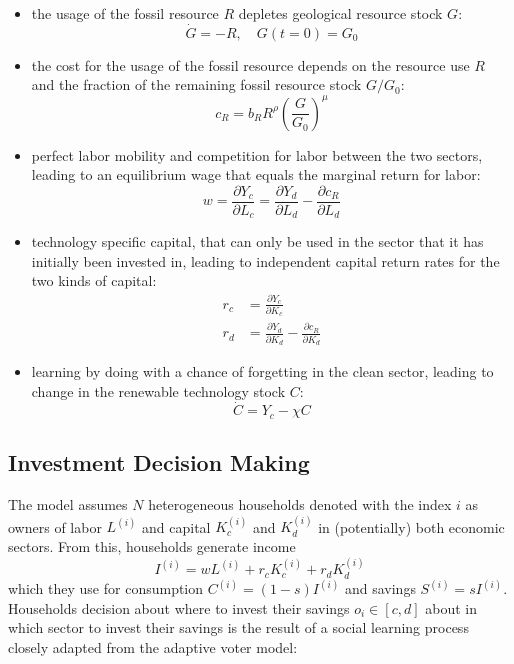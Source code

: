 \begin{itemize}
	\item the usage of the fossil resource $R$ depletes geological resource stock $G$:
		\begin{equation}
			\dot{G} = -R, \quad G(t=0) = G_0
			\label{resource_depletion}
		\end{equation}
	\item the cost for the usage of the fossil resource depends on the resource use $R$ and the fraction of the remaining fossil resource stock $G/G_0$:
		\begin{equation}
			c_R = b_R R^{\rho}\left( \frac{G}{G_0} \right)^{\mu}
			\label{resource cost}
		\end{equation}
	\item perfect labor mobility and competition for labor between the two sectors, leading to an equilibrium wage that equals the marginal return for labor:
		\begin{equation}
			w = \frac{\partial Y_c}{\partial L_c} = \frac{\partial Y_d}{\partial L_d} - \frac{\partial c_R}{\partial L_d}
			\label{equilibrium_wage}
		\end{equation}
	\item technology specific capital, that can only be used in the sector that it has initially been invested in, leading to independent capital return rates for the two kinds of capital:
		\begin{align}
			r_c &= \frac{\partial Y_c}{\partial K_c} \\
			r_d &= \frac{\partial Y_d}{\partial K_d} - \frac{\partial c_R}{\partial K_d}
		\end{align}
	\item learning by doing with a chance of forgetting in the clean sector, leading to change in the renewable technology stock $C$:
		\begin{equation}
			\dot{C} = Y_c - \chi C
			\label{learning_by_doing}
		\end{equation}
\end{itemize}

\subsection{Investment Decision Making}

The model assumes $N$ heterogeneous households denoted with the index $i$ as owners of labor $L^{(i)}$ and capital $K_c^{(i)}$ and $K_d^{(i)}$ in (potentially) both economic sectors.
From this, households generate income
\begin{equation}
	I^{(i)} = w L^{(i)} + r_c K_c^{(i)} + r_d K_d^{(i)}
	\label{household_income}
\end{equation}
which they use for consumption $C^{(i)} = (1-s) I^{(i)}$ and savings $S^{(i)} = s I^{(i)}$. Households decision about where to invest their savings $o_i \in [c,d]$ about in which sector to invest their savings is the result of a social learning process closely adapted from the adaptive voter model:

